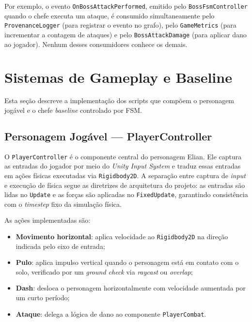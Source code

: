 Por exemplo, o evento \texttt{OnBossAttackPerformed}, emitido pelo
\texttt{BossFsmController} quando o chefe executa um ataque, é consumido
simultaneamente pelo \texttt{ProvenanceLogger} (para registrar o evento no
grafo), pelo \texttt{GameMetrics} (para incrementar a contagem de ataques) e
pelo \texttt{BossAttackDamage} (para aplicar dano ao jogador). Nenhum desses
consumidores conhece os demais.

\section{Sistemas de Gameplay e Baseline}
\label{sec:sistemas-gameplay}

Esta seção descreve a implementação dos scripts que compõem o personagem
jogável e o chefe \textit{baseline} controlado por FSM.

\subsection{Personagem Jogável --- PlayerController}
\label{subsec:player-controller}

O \texttt{PlayerController} é o componente central do personagem Elian. Ele
captura as entradas do jogador por meio do \textit{Unity Input System} e
traduz essas entradas em ações físicas executadas via \texttt{Rigidbody2D}.
A separação entre captura de \textit{input} e execução de física segue as
diretrizes de arquitetura do projeto: as entradas são lidas no \texttt{Update}
e as forças são aplicadas no \texttt{FixedUpdate}, garantindo consistência
com o \textit{timestep} fixo da simulação física.

As ações implementadas são:

\begin{itemize}
    \item \textbf{Movimento horizontal}: aplica velocidade ao
          \texttt{Rigidbody2D} na direção indicada pelo eixo de entrada;
    \item \textbf{Pulo}: aplica impulso vertical quando o personagem está em
          contato com o solo, verificado por um \textit{ground check}
          via \textit{raycast} ou \textit{overlap};
    \item \textbf{Dash}: desloca o personagem horizontalmente com velocidade
          aumentada por um curto período;
    \item \textbf{Ataque}: delega a lógica de dano ao componente
          \texttt{PlayerCombat}.
\end{itemize}

